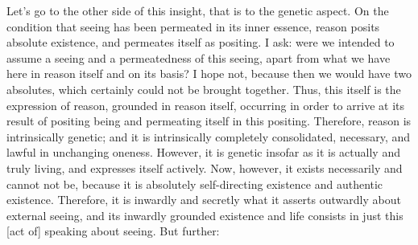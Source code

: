 Let’s go to the other side of this insight,
that is to the genetic aspect.
On the condition that seeing has been
permeated in its inner essence,
reason posits absolute existence,
and permeates itself as positing.
I ask: were we intended to assume a seeing
and a permeatedness of this seeing,
apart from what we have here in reason itself
and on its basis?
I hope not, because then we would have two absolutes,
which certainly could not be brought together.
Thus, this itself is the expression of reason,
grounded in reason itself,
occurring in order to arrive at its result of
positing being and permeating itself in this positing.
Therefore, reason is intrinsically genetic;
and it is intrinsically completely consolidated,
necessary, and lawful in unchanging oneness.
However, it is genetic insofar as
it is actually and truly living,
and expresses itself actively.
Now, however, it exists necessarily and cannot not be,
because it is absolutely self-directing existence
and authentic existence.
Therefore, it is inwardly and secretly
what it asserts outwardly about external seeing,
and its inwardly grounded existence and life
consists in just this [act of] speaking about seeing.
But further:

